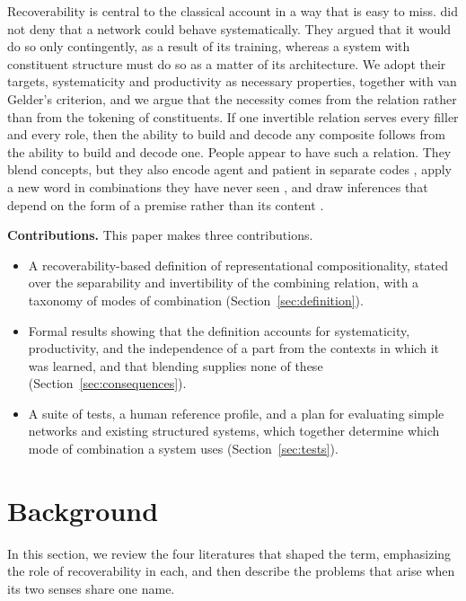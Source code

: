 \documentclass{article}
\theoremstyle{definition}
\theoremstyle{plain}
\theoremstyle{remark}
\begin{document}
Recoverability is central to the classical account in a way that is
easy to miss. \citet{fodor1990} did not deny that a network could behave
systematically. They argued that it would do so only contingently, as
a result of its training, whereas a system with constituent structure
must do so as a matter of its architecture. We adopt their targets,
systematicity and productivity as necessary properties, together with
van Gelder's criterion, and we argue that the necessity comes from the
relation rather than from the tokening of constituents. If one
invertible relation serves every filler and every role, then the
ability to build and decode any composite follows from the ability to
build and decode one. People appear to have such a relation. They
blend concepts, but they also encode agent and patient in separate
codes \citep{frankland2015}, apply a new word in combinations they
have never seen \citep{lake2019}, and draw inferences that depend on
the form of a premise rather than its content \citep{rips1994}.

\textbf{Contributions.} This paper makes three contributions.
\begin{itemize}
  \item A recoverability-based definition of representational
  compositionality, stated over the separability and invertibility of
  the combining relation, with a taxonomy of modes of combination
  (Section~\ref{sec:definition}).
  \item Formal results showing that the definition accounts for
  systematicity, productivity, and the independence of a part from the
  contexts in which it was learned, and that blending supplies none of
  these (Section~\ref{sec:consequences}).
  \item A suite of tests, a human reference profile, and a plan for
  evaluating simple networks and existing structured systems, which
  together determine which mode of combination a system uses
  (Section~\ref{sec:tests}).
\end{itemize}

\section{Background}
\label{sec:background}

In this section, we review the four literatures that shaped the term,
emphasizing the role of recoverability in each, and then describe the
problems that arise when its two senses share one name.
\end{document}
